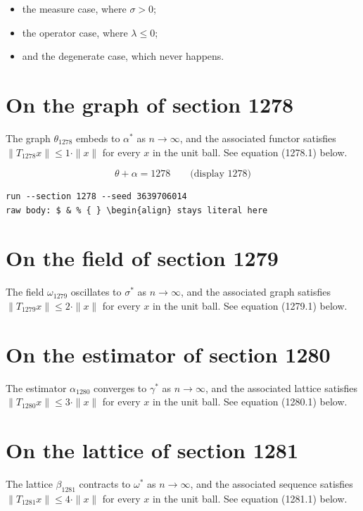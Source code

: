 \documentclass{article}
\begin{document}
\begin{itemize}
  \item the measure case, where $\sigma > 0$;
  \item the operator case, where $\lambda \leq 0$;
  \item and the degenerate case, which never happens.
\end{itemize}

\section{On the graph of section 1278}
The graph $\theta_{1278}$ embeds to $\alpha^{*}$ as $n \to \infty$,
and the associated functor satisfies $\|T_{1278} x\| \leq 1 \cdot \|x\|$
for every $x$ in the unit ball. See equation (1278.1) below.

$$
\theta + \alpha = 1278 \qquad \text{(display 1278)}
$$

\begin{verbatim}
run --section 1278 --seed 3639706014
raw body: $ & % { } \begin{align} stays literal here
\end{verbatim}

\section{On the field of section 1279}
The field $\omega_{1279}$ oscillates to $\sigma^{*}$ as $n \to \infty$,
and the associated graph satisfies $\|T_{1279} x\| \leq 2 \cdot \|x\|$
for every $x$ in the unit ball. See equation (1279.1) below.

\section{On the estimator of section 1280}
The estimator $\alpha_{1280}$ converges to $\gamma^{*}$ as $n \to \infty$,
and the associated lattice satisfies $\|T_{1280} x\| \leq 3 \cdot \|x\|$
for every $x$ in the unit ball. See equation (1280.1) below.

\section{On the lattice of section 1281}
The lattice $\beta_{1281}$ contracts to $\omega^{*}$ as $n \to \infty$,
and the associated sequence satisfies $\|T_{1281} x\| \leq 4 \cdot \|x\|$
for every $x$ in the unit ball. See equation (1281.1) below.
\end{document}
